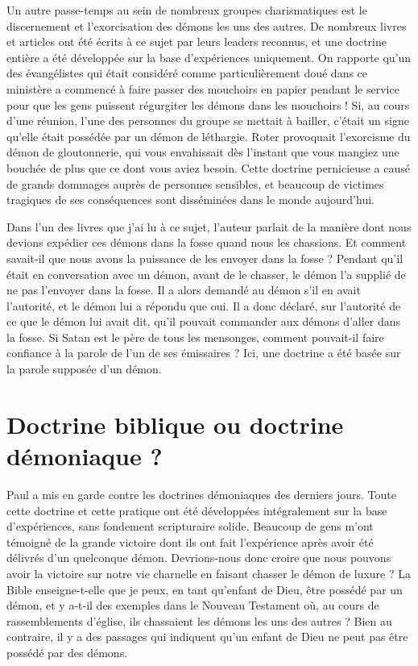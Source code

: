 Un autre passe-temps au sein de nombreux groupes charismatiques
 est le discernement et l'exorcisation des démons les uns des autres.
 De nombreux livres et articles ont été écrits à ce sujet par leurs leaders
 reconnus, et une doctrine entière a été développée sur la base d'expériences
 uniquement. On rapporte qu'un des évangélistes qui était considéré
 comme particulièrement doué dans ce ministère a commencé à faire passer
 des mouchoirs en papier pendant le service pour que les gens puissent
 régurgiter les démons dans les mouchoirs ! Si, au cours d'une réunion,
 l'une des personnes du groupe se mettait à bailler, c'était un signe
 qu'elle était possédée par un démon de léthargie. Roter provoquait
 l'exorcisme du démon de gloutonnerie, qui vous envahissait dès l'instant
 que vous mangiez une bouchée de plus que ce dont vous aviez besoin.
 Cette doctrine pernicieuse a causé de grands dommages auprès de personnes
 sensibles, et beaucoup de victimes tragiques de ses conséquences
 sont disséminées dans le monde aujourd'hui.

Dans l'un des livres que j'ai lu à ce sujet, l'auteur parlait
 de la manière dont nous devions expédier ces démons dans la fosse
 quand nous les chassions. Et comment savait-il que nous avons la puissance
 de les envoyer dans la fosse ? Pendant qu'il était en conversation
 avec un démon, avant de le chasser, le démon l'a supplié de ne pas
 l'envoyer dans la fosse. Il a alors demandé au démon s'il en avait
 l'autorité, et le démon lui a répondu que oui.
 Il a donc déclaré, sur l'autorité de ce que le démon lui avait dit,
 qu'il pouvait commander aux démons d'aller dans la fosse.
 Si Satan est le père de tous les mensonges, comment pouvait-il faire
 confiance à la parole de l'un de ses émissaires ?
 Ici, une doctrine a été basée sur la parole supposée d'un démon.


\section*{Doctrine biblique ou doctrine démoniaque ?}

\begin{specialpar}{}
Paul a mis en garde contre les doctrines démoniaques des derniers jours.
 Toute cette doctrine et cette pratique ont été développées intégralement
 sur la base d'expériences, sans fondement scripturaire solide.
 Beaucoup de gens m'ont témoigné de la grande victoire dont ils ont fait
 l'expérience après avoir été délivrés d'un quelconque démon.
 Devrions-nous donc croire que nous pouvons avoir la victoire
 sur notre vie charnelle en faisant chasser le démon de luxure ?
 La Bible enseigne-t-elle que je peux, en tant qu'enfant de Dieu,
 être possédé par un démon, et y a-t-il des exemples dans le Nouveau
 Testament où, au cours de rassemblements d'église, ils chassaient
 les démons les uns des autres ? Bien au contraire, il y a des passages
 qui indiquent qu'un enfant de Dieu ne peut pas être possédé par des démons.
\end{specialpar}

